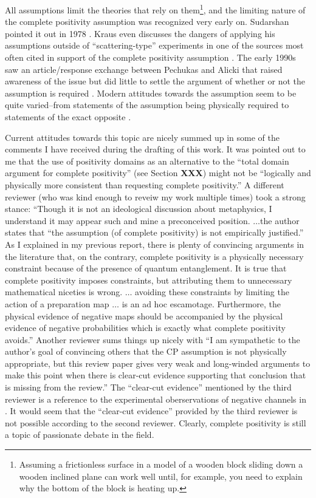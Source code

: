 All assumptions limit the theories that rely on them\footnote{Assuming a frictionless surface in a model of a wooden block sliding down a wooden inclined plane can work well until, for example, you need to explain why the bottom of the block is heating up.}, and the limiting nature of the complete positivity assumption was recognized very early on.  Sudarshan pointed it out in 1978 \cite{Sudarshan1978}.  Kraus even discusses the dangers of applying his assumptions outside of ``scattering-type'' experiments in one of the sources most often cited in support of the complete positivity assumption \cite{Kraus1983}.  The early 1990s saw an article/response exchange between Pechukas and Alicki that raised awareness of the issue but did little to settle the argument of whether or not the assumption is required \cite{Pechukas1994,Alicki1995,Pechukas1995}.  Modern attitudes towards the assumption seem to be quite varied--from statements of the assumption being physically required \cite{Benatti2005,Alicki2001} to statements of the exact opposite \cite{Sudarshan2005}. 

Current attitudes towards this topic are nicely summed up in some of the comments I have received during the drafting of this work.  It was pointed out to me that the use of positivity domains as an alternative to the ``total domain argument for complete positivity'' (see Section {\bf XXX}) might not be ``logically and physically more consistent than requesting complete positivity.''  A different reviewer (who was kind enough to reveiw my work multiple times) took a strong stance: ``Though it is not an ideological discussion about metaphysics, I understand it may appear such and mine a preconceived position. $\ldots$the author states that ``the assumption (of complete positivity) is not empirically justified.'' As I explained in my previous report, there is plenty of convincing arguments in the literature that, on the contrary, complete positivity is a physically necessary constraint because of the presence of quantum entanglement. It is true that complete positivity imposes constraints, but attributing them to unnecessary mathematical niceties is wrong.  $\ldots$ avoiding these constraints by limiting the action of a preparation map $\ldots$ is an ad hoc escamotage.  Furthermore, the physical evidence of negative maps should be accompanied by the physical evidence of negative probabilities which is exactly what complete positivity avoids.''  Another reviewer sums things up nicely with ``I am sympathetic to the author's goal of convincing others that the CP assumption is not physically appropriate, but this review paper gives very weak and long-winded arguments to make this point when there is clear-cut evidence supporting that conclusion that is missing from the review.''  The ``clear-cut evidence'' mentioned by the third reviewer is a reference to the experimental oberservations of negative channels in \cite{Boulant2004}.  It would seem that the ``clear-cut evidence'' provided by the third reviewer is not possible according to the second reviewer.  Clearly, complete positivity is still a topic of passionate debate in the field.

